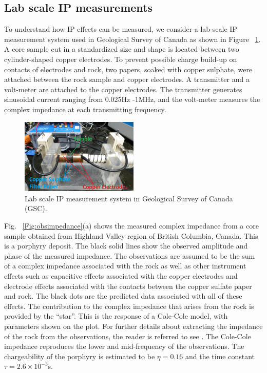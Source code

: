 \documentclass[letterpaper,11pt]{article}
\begin{document}
\subsection{Lab scale IP measurements}
To understand how IP effects can be measured, we consider a lab-scale IP measurement system used in Geological Survey of Canada \cite[]{Enkin2012} as shown in Figure ~\ref{Fig:instrumentIP}. A core sample cut in a standardized size and shape is located between two cylinder-shaped copper electrodes. To prevent possible charge build-up on contacts of electrodes and rock, two papers, soaked with copper sulphate, were attached between the rock sample and copper electrodes. A transmitter and a volt-meter are attached to the copper electrodes. The transmitter generates sinusoidal current ranging from 0.025Hz -1MHz, and the volt-meter measures the complex impedance at each transmitting frequency. 
\begin{figure}[htb]
  \centering
  \includegraphics[width=0.5\textwidth]{figures/instrumentIP.png}
  \caption{Lab scale IP measurement system in Geological Survey of Canada (GSC). }
  \label{Fig:instrumentIP}
\end{figure}

Fig. ~\ref{Fig:obsimpedance}(a) shows the measured complex impedance from a core sample obtained from Highland Valley region of British Columbia, Canada. This is a porphyry deposit. The black solid lines show the observed amplitude and phase of the measured impedance. The observations are assumed to be the sum of a complex impedance associated with the rock as well as other instrument effects such as capacitive effects associated with the copper electrodes and electrode effects associated with the contacts between the copper sulfate paper and rock. The black dots are the predicted data associated with all of these effects. The contribution to the complex impedance that arises from the rock is provided by the ``star''. This is the response of a Cole-Cole model, with parameters shown on the plot.  For further details about extracting the impedance of the rock from the observations, the reader is referred to see \cite{Enkin2012}. The Cole-Cole impedance reproduces the lower and mid-frequency of the observations. The chargeability of the porphyry is estimated to be $\eta=0.16$ and the time constant $\tau=2.6\times10^{-3}$s. 
\end{document}
